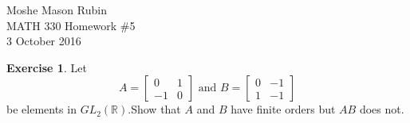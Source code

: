 \documentclass{article}
\theoremstyle{definition}
\newtheorem{theorem}{Exercise}[section]
\theoremstyle{remark}
\newcommand{\R}{\mathbb{R}}
\begin{document}
	\begin{flushright}
		Moshe Mason Rubin\\MATH 330 Homework \#5\\3 October 2016
	\end{flushright}

	\setcounter{section}{4}
	\setcounter{theorem}{13}
	\begin{theorem}
		Let \[A=\begin{bmatrix}
		0 & 1 \\ 
		-1 & 0
		\end{bmatrix} \text{ and } B=\begin{bmatrix}
		0 & -1 \\ 
		1 & -1
		\end{bmatrix} \] be elements in $GL_2\left(\R\right)$.Show that $A$ and $B$ have finite orders but $AB$ does not. 
	\end{theorem}
\end{document}
